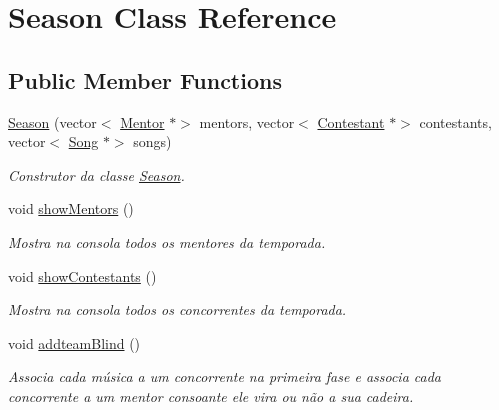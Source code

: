 \hypertarget{class_season}{}\section{Season Class Reference}
\label{class_season}
\subsection*{Public Member Functions}
\begin{DoxyCompactItemize}
\item 
\hyperlink{class_season_ae1b6176daa58d4bc4ad325f7cda57723}{Season} (vector$<$ \hyperlink{class_mentor}{Mentor} $\ast$$>$ mentors, vector$<$ \hyperlink{class_contestant}{Contestant} $\ast$$>$ contestants, vector$<$ \hyperlink{class_song}{Song} $\ast$$>$ songs)
\begin{DoxyCompactList}\small\item\em Construtor da classe \hyperlink{class_season}{Season}. \end{DoxyCompactList}\item 
\hypertarget{class_season_a8031a80200a364617e2a34e08415eaf4}{}\label{class_season_a8031a80200a364617e2a34e08415eaf4} 
void \hyperlink{class_season_a8031a80200a364617e2a34e08415eaf4}{show\+Mentors} ()
\begin{DoxyCompactList}\small\item\em Mostra na consola todos os mentores da temporada. \end{DoxyCompactList}\item 
\hypertarget{class_season_ac3d1532cd27bb5d9b74c37eee9ca11b4}{}\label{class_season_ac3d1532cd27bb5d9b74c37eee9ca11b4} 
void \hyperlink{class_season_ac3d1532cd27bb5d9b74c37eee9ca11b4}{show\+Contestants} ()
\begin{DoxyCompactList}\small\item\em Mostra na consola todos os concorrentes da temporada. \end{DoxyCompactList}\item 
\hypertarget{class_season_a16bdd5587657a529a955c817e0856394}{}\label{class_season_a16bdd5587657a529a955c817e0856394} 
void \hyperlink{class_season_a16bdd5587657a529a955c817e0856394}{addteam\+Blind} ()
\begin{DoxyCompactList}\small\item\em Associa cada música a um concorrente na primeira fase e associa cada concorrente a um mentor consoante ele vira ou não a sua cadeira. \end{DoxyCompactList}\item 
$$
\end{DoxyCompactItemize}
